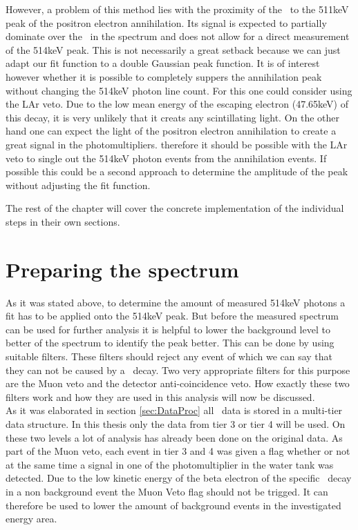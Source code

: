 \documentclass[encoding=utf8,british]{tumphthesis}
\begin{document}
However, a problem of this method lies with the proximity of the \Kr\ to the 511keV peak of the positron electron annihilation. 
Its signal is expected to partially dominate over the \Kr\ in the spectrum and does not allow for a direct measurement of the 514keV peak. 
This is not necessarily a great setback because we can just adapt our fit function to a double Gaussian peak function.
It is of interest however whether it is possible to completely suppers the annihilation peak without changing the 514keV photon line count.
For this one could consider using the LAr veto.
Due to the low mean energy of the escaping electron (47.65keV) of this decay, it is very unlikely that it creats any scintillating light. 
On the other hand one can expect the light of the positron electron annihilation to create a great signal in the photomultipliers.
therefore it should be possible with the LAr veto to single out the 514keV photon events from the annihilation events.
If possible this could be a second approach to determine the amplitude of the peak without adjusting the fit function.

The rest of the chapter will cover the concrete implementation of the individual steps in their own sections.
\\
\section{Preparing the spectrum}

As it was stated above, to determine the amount of measured 514keV photons a fit has to be applied onto the 514keV peak. 
But before the measured spectrum can be used for further analysis it is helpful to lower the background level to better of the spectrum to identify the peak better.
This can be done by using suitable filters.
These filters should reject any event of which we can say that they can not be caused by a \Kr\ decay.
Two very appropriate filters for this purpose are the Muon veto and the detector anti-coincidence veto.
How exactly these two filters work and how they are used in this analysis will now be discussed.
\\

As it was elaborated in section \ref{sec:DataProc} all \gerda\ data is stored in a multi-tier data structure. 
In this thesis only the data from tier 3 or tier 4 will be used.
On these two levels a lot of analysis has already been done on the original data. 
As part of the Muon veto, each event in tier 3 and 4 was given a flag whether or not at the same time a signal in one of the photomultiplier in the water tank was detected. 
Due to the low kinetic energy of the beta electron of the specific \Kr\ decay in a non background event the Muon Veto flag should not be trigged.
It can therefore be used to lower the amount of background events in the investigated energy area.
\\
\end{document}

